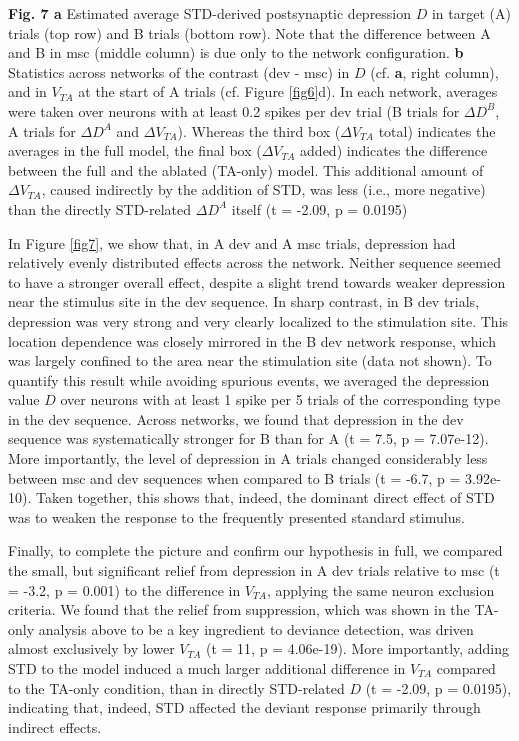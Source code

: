 \documentclass[pdflatex,referee,iicol,sn-basic]{sn-jnl}
\theoremstyle{thmstyleone}%
\theoremstyle{thmstyletwo}%
\theoremstyle{thmstylethree}%
\begin{document}
\textbf{Fig. 7 a} Estimated average STD-derived postsynaptic depression $D$ in target (A) trials (top row) and B trials (bottom row). Note that the difference between A and B in msc (middle column) is due only to the network configuration. \textbf{b} Statistics across networks of the contrast (dev - msc) in $D$ (cf. \textbf{a}, right column), and in $V_{TA}$ at the start of A trials (cf. Figure \ref{fig6}d). In each network, averages were taken over neurons with at least 0.2 spikes per dev trial (B trials for $\Delta D^B$, A trials for $\Delta D^A$ and $\Delta V_{TA}$). Whereas the third box ($\Delta V_{TA}$ total) indicates the averages in the full model, the final box ($\Delta V_{TA}$ added) indicates the difference between the full and the ablated (TA-only) model. This additional amount of $\Delta V_{TA}$, caused indirectly by the addition of STD, was less (i.e., more negative) than the directly STD-related $\Delta D^A$ itself (t = -2.09, p = 0.0195)

In Figure \ref{fig7}, we show that, in A dev and A msc trials, depression had relatively evenly distributed effects across the network. Neither sequence seemed to have a stronger overall effect, despite a slight trend towards weaker depression near the stimulus site in the dev sequence. In sharp contrast, in B dev trials, depression was very strong and very clearly localized to the stimulation site. This location dependence was closely mirrored in the B dev network response, which was largely confined to the area near the stimulation site (data not shown). To quantify this result while avoiding spurious events, we averaged the depression value $D$ over neurons with at least 1 spike per 5 trials of the corresponding type in the dev sequence. Across networks, we found that depression in the dev sequence was systematically stronger for B than for A (t = 7.5, p = 7.07e-12). More importantly, the level of depression in A trials changed considerably less between msc and dev sequences when compared to B trials (t = -6.7, p = 3.92e-10). Taken together, this shows that, indeed, the dominant direct effect of STD was to weaken the response to the frequently presented standard stimulus.

Finally, to complete the picture and confirm our hypothesis in full, we compared the small, but significant relief from depression in A dev trials relative to msc (t = -3.2, p = 0.001) to the difference in $V_{TA}$, applying the same neuron exclusion criteria. We found that the relief from suppression, which was shown in the TA-only analysis above to be a key ingredient to deviance detection, was driven almost exclusively by lower $V_{TA}$ (t = 11, p = 4.06e-19). More importantly, adding STD to the model induced a much larger additional difference in $V_{TA}$ compared to the TA-only condition, than in directly STD-related $D$ (t = -2.09, p = 0.0195), indicating that, indeed, STD affected the deviant response primarily through indirect effects.
\end{document}
